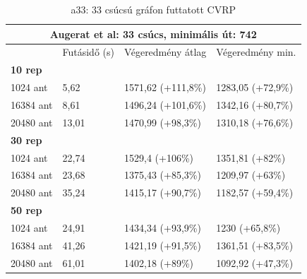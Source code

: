 \begin{table}[ht!]
	\centering
	\begin{tabular}{|p{2cm}||p{3cm}|p{3.5cm}|p{3.5cm}|}
		\hline
		\multicolumn{4}{|c|}{Augerat et al: 33 csúcs, minimális út: 742} \\
		\hline
		& Futásidő (s) & Végeredmény átlag & Végeredmény min.\\
		\hline
		\textbf{10 rep} & & &\\
		1024 ant & 5,62 & 1571,62 (+111,8\%) & 1283,05 (+72,9\%)\\
		16384 ant & 8,61 & 1496,24 (+101,6\%) & 1342,16 (+80,7\%) \\
		20480 ant & 13,01 & 1470,99 (+98,3\%) & 1310,18 (+76,6\%) \\
		\hline
		\textbf{30 rep} & & & \\
		1024 ant & 22,74 & 1529,4 (+106\%)& 1351,81 (+82\%)\\
		16384 ant & 23,68 & 1375,43 (+85,3\%) & 1209,97 (+63\%)\\
		20480 ant & 35,24 & 1415,17 (+90,7\%) & 1182,57 (+59,4\%) \\
		\hline
		\textbf{50 rep} & & & \\
		1024 ant & 24,91 & 1434,34 (+93,9\%) & 1230 (+65,8\%)\\
		16384 ant & 41,26 & 1421,19 (+91,5\%) & 1361,51 (+83,5\%) \\
		20480 ant & 61,01 & 1402,18 (+89\%) & 1092,92 (+47,3\%) \\
		\hline
	\end{tabular}
	\caption{a33: 33 csúcsú gráfon futtatott CVRP}
	\label{table:CVRP_a33}
\end{table}


